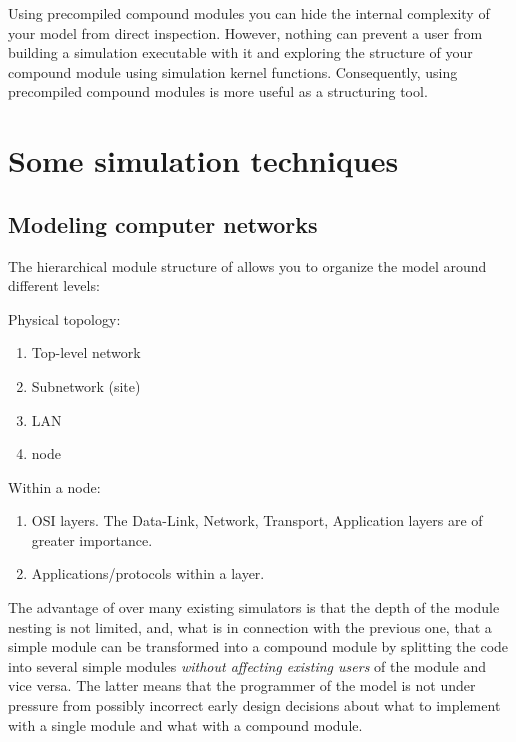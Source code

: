 Using precompiled compound modules
you can hide the internal complexity of your model from direct
inspection. However, nothing can prevent a user from building a
simulation executable with it and exploring the structure of your
compound module using {\opp} simulation kernel
functions. Consequently, using precompiled
compound modules is more useful as a
structuring tool.



\section{Some simulation techniques}

\subsection{Modeling computer networks}

The hierarchical module structure of {\opp} allows you to organize 
the model around different levels:

Physical topology:
\begin{enumerate}
\item{Top-level network}
\item{Subnetwork (site)}
\item{LAN}
\item{node}
\end{enumerate}

Within a node:
\begin{enumerate}
\item{OSI layers. The Data-Link, Network, Transport, Application layers 
are of greater importance.}
\item{Applications/protocols within a layer.}
\end{enumerate}

The advantage of {\opp} over many existing simulators is that the
depth of the module nesting is not
limited, and, what is in connection with the previous one, that a
simple module can be transformed into a
compound module by splitting the code into
several simple modules \textit{without affecting
  existing users} of the module and vice versa. The latter means that
the programmer of the model is not under pressure from possibly
incorrect early design decisions about what to implement with a single
module and what with a compound module.



